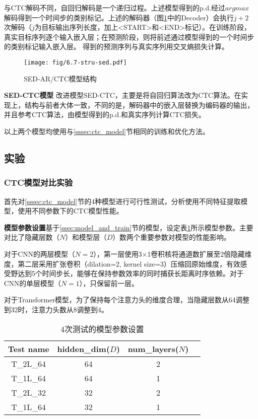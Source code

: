 与CTC解码不同，自回归解码是一个递归过程。上述模型得到的p.d.经过$argmax$解码得到一个时间步的类别标记。上述的解码器（图\ref{fig:6.7-stru-sed}中的Decoder）会执行$j+2$次解码（$j$为目标输出序列长度，加上<START>和<END>标记）。在训练阶段，真实目标序列逐个输入嵌入层；在预测阶段，则将前述通过模型得到的一个时间步的类别标记输入嵌入层。
得到的预测序列与真实序列用交叉熵损失计算。

\begin{figure}
    \centering
    \texttt{[image: fig/6.7-stru-sed.pdf]}
    \caption{SED-AR/CTC模型结构}
    \label{fig:6.7-stru-sed}
\end{figure}

\textbf{SED-CTC模型}\hspace{5pt} 改进模型SED-CTC，主要是将自回归算法改为CTC算法。在实现上，结构与前者大体一致，不同的是，解码器中的嵌入层替换为编码器的输出，并且参考CTC算法\cites{graves2006connectionist}，由模型得到的p.d.和真实序列计算CTC损失。

以上两个模型均使用与\ref{sssec:ctc_model}节相同的训练和优化方法。

\subsection{实验}

\subsubsection{CTC模型对比实验}

首先对\ref{sssec:ctc_model}节的4种模型进行可行性测试，分析使用不同特征提取模型，使用不同参数下的CTC模型性能。

\textbf{模型参数设置}\hspace{5pt}基于\ref{ssec:model_and_train}节的模型，设定表\ref{tab:model_para_setting}所示模型参数。主要对比了隐藏层数（$N$）和模型层（$D$）数两个重要参数对模型的性能影响。

对于CNN的两层模型（$N=2$），第一层使用3×1卷积核将通道数扩展至2倍隐藏维度，第二层采用扩张卷积（dilation=2, kernel size=3）压缩回原始维度，有效感受野达到5个时间步长，能够在保持参数效率的同时捕获长距离时序依赖。对于CNN的单层模型（$N=1$），只保留前一层。

对于Transformer模型，为了保持每个注意力头的维度合理，当隐藏层数从64调整到32时，注意力头数从8调整到4。

\begin{table}
    \centering
    \caption{4次测试的模型参数设置}
    \begin{tabular}{cccc}
    \hline
         \textbf{Test name}& \textbf{hidden\_dim($D$)} & \textbf{num\_layers($N$)}\\
         \hline
         T\_2L\_64 & 64 & 2  \\
         T\_1L\_64 & 64 & 1  \\
         T\_2L\_32 & 32 & 2  \\
         T\_1L\_64 & 32 & 1  \\
         \hline
    \end{tabular}
    \label{tab:model_para_setting}
\end{table}

